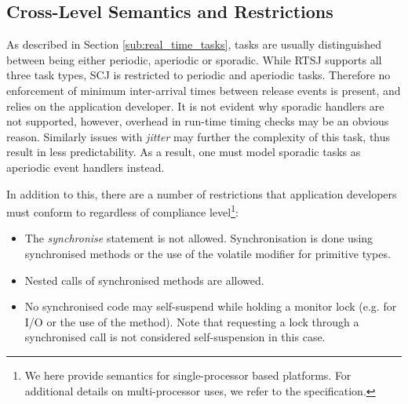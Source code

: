 \subsection{Cross-Level Semantics and Restrictions} %
\label{sub:cross_level_restrictions}
As described in Section \ref{sub:real_time_tasks}, tasks are usually distinguished between being either periodic, aperiodic or sporadic. While RTSJ supports all three task types, SCJ is restricted to periodic and aperiodic tasks. Therefore no enforcement of minimum inter-arrival times between release events is present, and relies on the application developer. It is not evident why sporadic handlers are not supported, however, overhead in run-time timing checks may be an obvious reason. Similarly issues with \textit{jitter} may further the complexity of this task, thus result in less predictability. As a result, one must model sporadic tasks as aperiodic event handlers instead.

In addition to this, there are a number of restrictions that application developers must conform to regardless of compliance level\footnote{We here provide semantics for single-processor based platforms. For additional details on multi-processor uses, we refer to the specification.}:
\begin{itemize}
	\item The \textit{synchronise} statement is not allowed. Synchronisation is done using synchronised methods or the use of the volatile modifier for primitive types.
	\item Nested calls of synchronised methods are allowed.
	\item No synchronised code may self-suspend while holding a monitor lock (e.g. for I/O or the use of the  method). Note that requesting a lock through a synchronised call is not considered self-suspension in this case.
\end{itemize}

